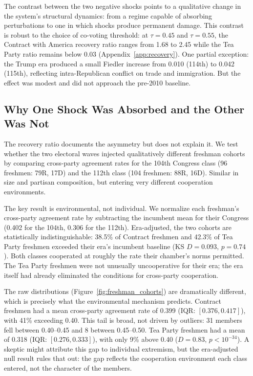 \documentclass[12pt, a4paper]{article}
\begin{document}
The contrast between the two negative shocks points to a qualitative change in the system's structural dynamics: from a regime capable of absorbing perturbations to one in which shocks produce permanent damage. This contrast is robust to the choice of co-voting threshold: at $\tau = 0.45$ and $\tau = 0.55$, the Contract with America recovery ratio ranges from 1.68 to 2.45 while the Tea Party ratio remains below 0.03 (Appendix~\ref{app:recovery}). One partial exception: the Trump era produced a small Fiedler increase from 0.010 (114th) to 0.042 (115th), reflecting intra-Republican conflict on trade and immigration. But the effect was modest and did not approach the pre-2010 baseline.

\subsection{Why One Shock Was Absorbed and the Other Was Not}

The recovery ratio documents the asymmetry but does not explain it. We test whether the two electoral waves injected qualitatively different freshman cohorts by comparing cross-party agreement rates for the 104th Congress class (96 freshmen: 79R, 17D) and the 112th class (104 freshmen: 88R, 16D). Similar in size and partisan composition, but entering very different cooperation environments.

The key result is environmental, not individual. We normalize each freshman's cross-party agreement rate by subtracting the incumbent mean for their Congress (0.402 for the 104th, 0.306 for the 112th). Era-adjusted, the two cohorts are statistically indistinguishable: 38.5\% of Contract freshmen and 42.3\% of Tea Party freshmen exceeded their era's incumbent baseline (KS $D = 0.093$, $p = 0.74$). Both classes cooperated at roughly the rate their chamber's norms permitted. The Tea Party freshmen were not unusually uncooperative for their era; the era itself had already eliminated the conditions for cross-party cooperation.

The raw distributions (Figure~\ref{fig:freshman_cohorts}) are dramatically different, which is precisely what the environmental mechanism predicts. Contract freshmen had a mean cross-party agreement rate of 0.399 (IQR: $[0.376, 0.417]$), with 41\% exceeding 0.40. This tail is broad, not driven by outliers: 31 members fell between 0.40--0.45 and 8 between 0.45--0.50. Tea Party freshmen had a mean of 0.318 (IQR: $[0.276, 0.333]$), with only 9\% above 0.40 ($D = 0.83$, $p < 10^{-34}$). A skeptic might attribute this gap to individual extremism, but the era-adjusted null result rules that out: the gap reflects the cooperation environment each class entered, not the character of the members.
\end{document}
